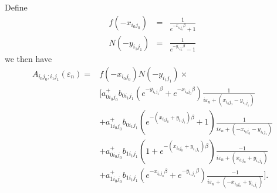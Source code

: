 Define
\begin{eqnarray}
f(-x_{i_0 j_0}) & = & \frac{1}{e^{-x_{i_0 j_0}\beta} + 1} \\
N(-y_{i_1 j_1}) & = & \frac{1}{e^{-y_{i_1 j_1}\beta} - 1}
\end{eqnarray}
we then have
\begin{equation}
\begin{split}
A_{i_0 j_0; i_1 j_1}(\varepsilon_n) = & 
f(-x_{i_0 j_0}) N(-y_{i_1 j_1}) \times \\
& \bigg[ a^+_{0 i_0 j_0} b_{0 i_1 j_1} 
(e^{- y_{i_1 j_1}\beta} + e^{-x_{i_0 j_0}\beta})
\frac{1}{i\varepsilon_n + (x_{i_0 j_0} - y_{i_1 j_1})} \\
 &
+ a^+_{1 i_0 j_0} b_{0 i_1 j_1}
(e^{-(x_{i_0 j_0} + y_{i_1 j_1})\beta} + 1)
\frac{1}{i\varepsilon_n + (-x_{i_0 j_0} - y_{i_1 j_1})} \\
 &
+ a^+_{0 i_0 j_0} b_{1 i_1 j_1}
(1+e^{-(x_{i_0 j_0} + y_{i_1 j_1})\beta})
\frac{-1}{i\varepsilon_n + (x_{i_0 j_0} + y_{i_1 j_1})} \\
&
+ a^+_{1 i_0 j_0} b_{1 i_1 j_1}
(e^{-x_{i_0 j_0}\beta} + e^{-y_{i_1 j_1}\beta})
\frac{-1}{i\varepsilon_n + (-x_{i_0 j_0} + y_{i_1 j_1})} \bigg].
\end{split}
\end{equation}
